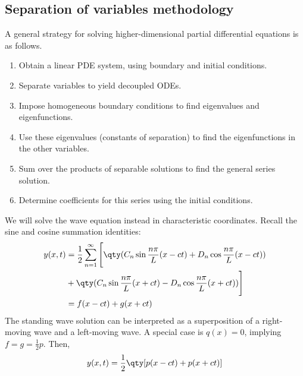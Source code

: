 \subsection{Separation of variables methodology}
A general strategy for solving higher-dimensional partial differential equations is as follows.
\begin{enumerate}
	\item Obtain a linear PDE system, using boundary and initial conditions.
	\item Separate variables to yield decoupled ODEs.
	\item Impose homogeneous boundary conditions to find eigenvalues and eigenfunctions.
	\item Use these eigenvalues (constants of separation) to find the eigenfunctions in the other variables.
	\item Sum over the products of separable solutions to find the general series solution.
	\item Determine coefficients for this series using the initial conditions.
\end{enumerate}
\begin{example}
	We will solve the wave equation instead in characteristic coordinates.
	Recall the sine and cosine summation identities:
	\begin{align*}
		y(x,t) & = \frac{1}{2} \sum_{n=1}^\infty \Bigg[ \qty(C_n \sin \frac{n \pi}{L}(x-ct) + D_n \cos \frac{n \pi}{L}(x-ct)) \\&
		+ \qty(C_n \sin \frac{n \pi}{L}(x+ct) - D_n \cos \frac{n \pi}{L}(x+ct)) \Bigg]                                        \\
		       & = f(x-ct) + g(x+ct)
	\end{align*}
	The standing wave solution can be interpreted as a superposition of a right-moving wave and a left-moving wave.
	A special case is $q(x) = 0$, implying $f = g = \frac{1}{2} p$.
	Then,
	\begin{align*}
		y(x,t) = \frac{1}{2}\qty[p(x-ct) + p(x+ct)]
	\end{align*}
\end{example}

